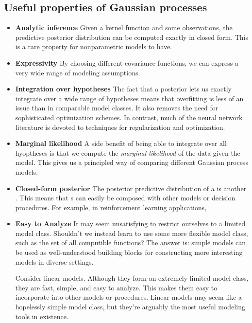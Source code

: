\subsection{Useful properties of Gaussian processes}

\begin{itemize}

\item {\bf Analytic inference}
Given a kernel function and some observations, the predictive posterior distribution can be computed exactly in closed form.  This is a rare property for nonparametric models to have.

\item {\bf Expressivity}
By choosing different covariance functions, we can express a very wide range of modeling assumptions.

\item {\bf Integration over hypotheses}
The fact that a \gp{} posterior lets us exactly integrate over a wide range of hypotheses means that overfitting is less of an issue than in comparable model classes.
It also removes the need for sophisticated optimization schemes.
%
In contrast, much of the neural network literature is devoted to techniques for regularization and optimization.

\item {\bf Marginal likelihood}
A side benefit of being able to integrate over all hyoptheses is that we compute the \emph{marginal likelihood} of the data given the model.
This gives us a principled way of comparing different Gaussian process models.

\item {\bf Closed-form posterior}
The posterior predictive distribution of a \gp{} is another \gp{}.
This means that \gp{}s can easily be composed with other models or decision procedures.
For example, in reinforcement learning applications, 

\item {\bf Easy to Analyze}
It may seem unsatisfying to restrict ourselves to a limited model class.
Shouldn't we instead learn to use some more flexible model class, such as the set of all computible functions?
The answer is: simple models can be used as well-understood building blocks for constructing more interesting models in diverse settings.

Consider linear models.
Although they form an extremely limited model class, they are fast, simple, and easy to analyze.
This makes them easy to incorporate into other models or procedures.
Linear models may seem like a hopelessly simple model class, but they're arguably the most useful modeling tools in existence.

\end{itemize}




